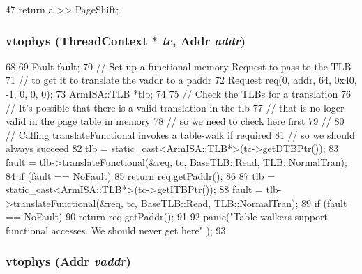 \begin{DoxyCode}
47 { return a >> PageShift; }
\end{DoxyCode}
\hypertarget{namespaceAlphaISA_af1014ad6d87b8a97e9d660234574a565}{
\subsubsection[{vtophys}]{ vtophys ({\bf ThreadContext} $\ast$ {\em tc}, \/  {\bf Addr} {\em addr})}}
\label{namespaceAlphaISA_af1014ad6d87b8a97e9d660234574a565}



\begin{DoxyCode}
68 {
69     Fault fault;
70     // Set up a functional memory Request to pass to the TLB
71     // to get it to translate the vaddr to a paddr
72     Request req(0, addr, 64, 0x40, -1, 0, 0, 0);
73     ArmISA::TLB *tlb;
74 
75     // Check the TLBs for a translation
76     // It's possible that there is a valid translation in the tlb
77     // that is no loger valid in the page table in memory
78     // so we need to check here first
79     //
80     // Calling translateFunctional invokes a table-walk if required
81     // so we should always succeed
82     tlb = static_cast<ArmISA::TLB*>(tc->getDTBPtr());
83     fault = tlb->translateFunctional(&req, tc, BaseTLB::Read, TLB::NormalTran);
84     if (fault == NoFault)
85         return req.getPaddr();
86 
87     tlb = static_cast<ArmISA::TLB*>(tc->getITBPtr());
88     fault = tlb->translateFunctional(&req, tc, BaseTLB::Read, TLB::NormalTran);
89     if (fault == NoFault)
90         return req.getPaddr();
91 
92     panic("Table walkers support functional accesses. We should never get here\n"
      );
93 }
\end{DoxyCode}
\hypertarget{namespaceAlphaISA_a3828815371ad2b0a1be60abdcb405cf9}{
\subsubsection[{vtophys}]{ vtophys ({\bf Addr} {\em vaddr})}}
\label{namespaceAlphaISA_a3828815371ad2b0a1be60abdcb405cf9}



